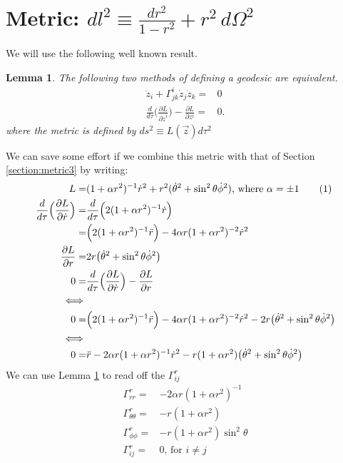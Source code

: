 \documentclass[]{article}
\newtheorem{lemma}{Lemma}
\newcommand\numberthis{\addtocounter{equation}{1}\tag{\theequation}}
\begin{document}
\section{Metric: $dl^2\equiv\frac{dr^2}{1-r^2}+r^2\,d\Omega^2$} \label{section:metric1}
We will use the following well known result.
\begin{lemma}\label{lemma:geodesic}
	The following two methods of defining a geodesic are equivalent.
	\begin{align*}
	\ddot{z}_i + \Gamma^i_{jk}\dot{z}_j \dot{z}_k =& 0 \\
	\frac{d}{d \tau}\Big(\frac{\partial L}{\partial \dot{z}^i}\Big)-\frac{\partial L}{\partial z^i}=&0.
	\end{align*}
	where the metric is defined by $ds^2\equiv L(\vec{z}) d\tau^2$ 
\end{lemma}
We can save some effort if we combine this metric with that of Section \ref{section:metric3} by writing:
\begin{align*}
L=&(1+\alpha r^2)^{-1}\dot{r}^2 + r^2(\dot\theta^2 + \sin^2 \theta \dot \phi^2)\text{, where $\alpha=\pm 1$} \numberthis \label{eq:lagrangian1}\\
\frac{d}{d \tau}\Big(\frac{\partial L}{\partial \dot{r}}\Big)=&\frac{d}{d \tau}\Big(2(1+\alpha r^2)^{-1}\dot r\Big)\\
=& \Big(2(1+\alpha r^2)^{-1}\ddot r\Big)-4 \alpha r (1+\alpha r^2)^{-2}\dot{r}^2\\
\frac{\partial L}{\partial r}=&2r\big(\dot{\theta}^2 + \sin^2 \theta \dot \phi ^2\big)\\
0=&\frac{d}{d \tau}\Big(\frac{\partial L}{\partial \dot{r}}\Big)-\frac{\partial L}{\partial r}\\
\iff&\\
0=&	\Big(2(1+\alpha r^2)^{-1}\ddot r\Big)-4 \alpha r (1+\alpha r^2)^{-2}\dot{r}^2-2r\big(\dot{\theta}^2 + \sin^2 \theta \dot \phi ^2\big)\\
\iff&\\
0=&\ddot r-2 \alpha r (1+\alpha r^2)^{-1}\dot{r}^2-r(1+\alpha r^2)\big(\dot{\theta}^2 + \sin^2 \theta \dot \phi ^2\big)
\end{align*}
We can use Lemma \ref{lemma:geodesic} to read off the $\Gamma^r_{ij}$
\begin{align*}
\Gamma^r_{rr}=&-2 \alpha r (1+\alpha r^2)^{-1}\\
\Gamma^r_{\theta\theta}=&-r(1+\alpha r^2)\\
\Gamma^r_{\phi\phi}=&-r(1+\alpha r^2)\sin^2 \theta\\
\Gamma^r_{ij}=& 0\text{, for $i\ne j$}
\end{align*}
\end{document}
